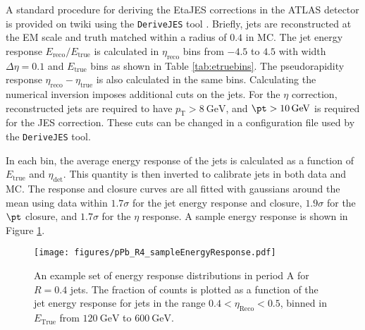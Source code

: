 \documentclass[NOTE, atlasdraft=true, texlive=2016, USenglish]{\ATLASLATEXPATH atlasdoc}
\begin{document}
A standard procedure for deriving the EtaJES corrections in the ATLAS detector is provided on twiki using the \texttt{DeriveJES} tool \cite{DeriveMCJES2015}. Briefly, jets are reconstructed at the EM scale and truth matched within a radius of $0.4$ in MC. The jet energy response $E_{\text{reco}}/E_{\text{true}}$ is calculated in $\eta_{\text{reco}}$ bins from $-4.5$ to $4.5$ with width $\Delta\eta = 0.1$ and $E_{\text{true}}$ bins as shown in Table \ref{tab:etruebins}. The pseudorapidity response $\eta_{\text{reco}}-\eta_{\text{true}}$ is also calculated in the same bins. Calculating the numerical inversion imposes additional cuts on the jets. For the $\eta$ correction, reconstructed jets are required to have $p_{\text{T}} > \SI{8}{\GeV}$, and $\pt > \SI{10}{\GeV}$ is required for the JES correction. These cuts can be changed in a configuration file used by the \texttt{DeriveJES} tool.\par
In each bin, the average energy response of the jets is calculated as a function of $E_{\text{true}}$ and $\eta_{\text{det}}$. This quantity is then inverted to calibrate jets in both data and MC. The response and closure curves are all fitted with gaussians around the mean using data within $1.7\sigma$ for the jet energy response and closure, $1.9\sigma$ for the $\pt$ closure, and $1.7\sigma$ for the $\eta$ response. A sample energy response is shown in Figure \ref{fig:SampleEnergyResponse}.
\begin{center}
\begin{table}
\caption{$E_{\text{true}}$ bin edges used in deriving the EtaJES corrections.}
\label{tab:etruebins}
\end{table}
\end{center}
\begin{figure}[htbp]
	\centering
	\texttt{[image: figures/pPb\_R4\_sampleEnergyResponse.pdf]}
	\caption{An example set of energy response distributions in period A for $R=0.4$ jets. The fraction of counts is plotted as a function of the jet energy response for jets in the range $0.4<\eta_{\text{Reco}}<0.5$, binned in $E_{\text{True}}$ from $\SI{120}{\GeV}$ to $\SI{600}{\GeV}$.}
	\label{fig:SampleEnergyResponse}
\end{figure}\par
\end{document}
